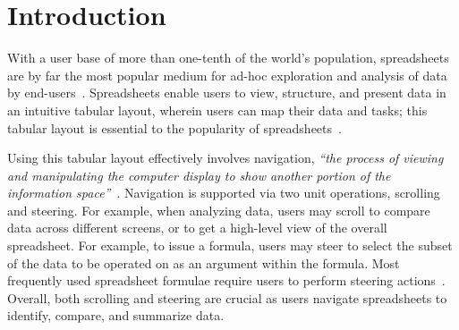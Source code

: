 \section{Introduction}
\label{sec:intro}
With a user base of more than one-tenth of the world's population,
spreadsheets are by far the most popular medium for ad-hoc exploration
and analysis of data by end-users~\cite{excel-users}. 
Spreadsheets enable users to view, structure, and present data
in an intuitive tabular layout, wherein users can map their data and tasks;
this tabular layout is essential to
the popularity of spreadsheets~\cite{nardi1990spreadsheet}.

Using this tabular layout effectively involves
navigation, \ie
{\em ``the process of viewing and manipulating the computer display to
show another portion of the information space''}~\cite{nav-study}.
Navigation is supported
via two unit operations, scrolling and steering.
For example, when analyzing data, users may scroll
to compare data across different screens, or to get
a high-level view of the overall spreadsheet.
 For example, to issue a formula,
users may steer to select
the subset of the data
to be operated on as an argument within the formula.
Most frequently used spreadsheet formulae
require users to perform steering actions~\cite{bradbard2014spreadsheet, lawson2009comparison}.
Overall, both scrolling and steering are crucial as
users navigate spreadsheets to
identify, compare, and summarize data.

